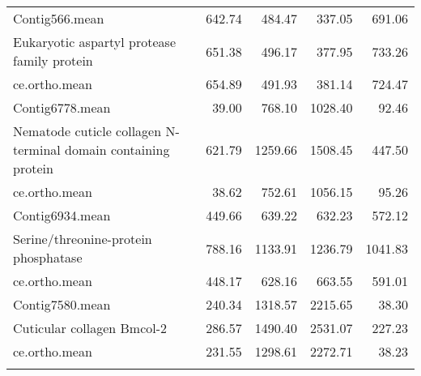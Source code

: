 \begin{longtable}{p{7cm}rrrr}
Contig566.mean & 642.74 & 484.47 & 337.05 & 691.06 \\ 
  Eukaryotic aspartyl protease family protein & 651.38 & 496.17 & 377.95 & 733.26 \\ 
  ce.ortho.mean & 654.89 & 491.93 & 381.14 & 724.47 \\ 
   \hline
Contig6778.mean & 39.00 & 768.10 & 1028.40 & 92.46 \\ 
  Nematode cuticle collagen N-terminal domain containing protein & 621.79 & 1259.66 & 1508.45 & 447.50 \\ 
  ce.ortho.mean & 38.62 & 752.61 & 1056.15 & 95.26 \\ 
   \hline
Contig6934.mean & 449.66 & 639.22 & 632.23 & 572.12 \\ 
  Serine/threonine-protein phosphatase & 788.16 & 1133.91 & 1236.79 & 1041.83 \\ 
  ce.ortho.mean & 448.17 & 628.16 & 663.55 & 591.01 \\ 
   \hline
Contig7580.mean & 240.34 & 1318.57 & 2215.65 & 38.30 \\ 
  Cuticular collagen Bmcol-2 & 286.57 & 1490.40 & 2531.07 & 227.23 \\ 
  ce.ortho.mean & 231.55 & 1298.61 & 2272.71 & 38.23 \\ 
  \hline\\
\end{longtable}

